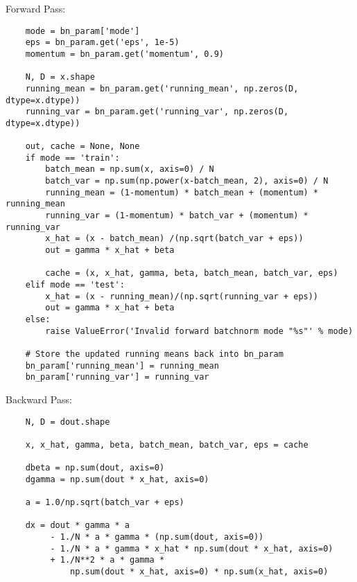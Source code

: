 \documentclass[12pt,letter]{article}
\begin{document}
\begin{enumerate}
    \pagebreak
    
  Forward Pass:
\begin{verbatim}
    mode = bn_param['mode']
    eps = bn_param.get('eps', 1e-5)
    momentum = bn_param.get('momentum', 0.9)

    N, D = x.shape
    running_mean = bn_param.get('running_mean', np.zeros(D, dtype=x.dtype))
    running_var = bn_param.get('running_var', np.zeros(D, dtype=x.dtype))

    out, cache = None, None
    if mode == 'train':
        batch_mean = np.sum(x, axis=0) / N
        batch_var = np.sum(np.power(x-batch_mean, 2), axis=0) / N
        running_mean = (1-momentum) * batch_mean + (momentum) * running_mean
        running_var = (1-momentum) * batch_var + (momentum) * running_var
        x_hat = (x - batch_mean) /(np.sqrt(batch_var + eps))
        out = gamma * x_hat + beta

        cache = (x, x_hat, gamma, beta, batch_mean, batch_var, eps)
    elif mode == 'test':
        x_hat = (x - running_mean)/(np.sqrt(running_var + eps))
        out = gamma * x_hat + beta
    else:
        raise ValueError('Invalid forward batchnorm mode "%s"' % mode)

    # Store the updated running means back into bn_param
    bn_param['running_mean'] = running_mean
    bn_param['running_var'] = running_var
\end{verbatim}
  
  Backward Pass:
\begin{verbatim}
    N, D = dout.shape
    
    x, x_hat, gamma, beta, batch_mean, batch_var, eps = cache
    
    dbeta = np.sum(dout, axis=0)
    dgamma = np.sum(dout * x_hat, axis=0)

    a = 1.0/np.sqrt(batch_var + eps)

    dx = dout * gamma * a
         - 1./N * a * gamma * (np.sum(dout, axis=0))
         - 1./N * a * gamma * x_hat * np.sum(dout * x_hat, axis=0)
         + 1./N**2 * a * gamma * 
             np.sum(dout * x_hat, axis=0) * np.sum(x_hat, axis=0)
\end{verbatim}

  \pagebreak
  

\end{enumerate}
\end{document}
